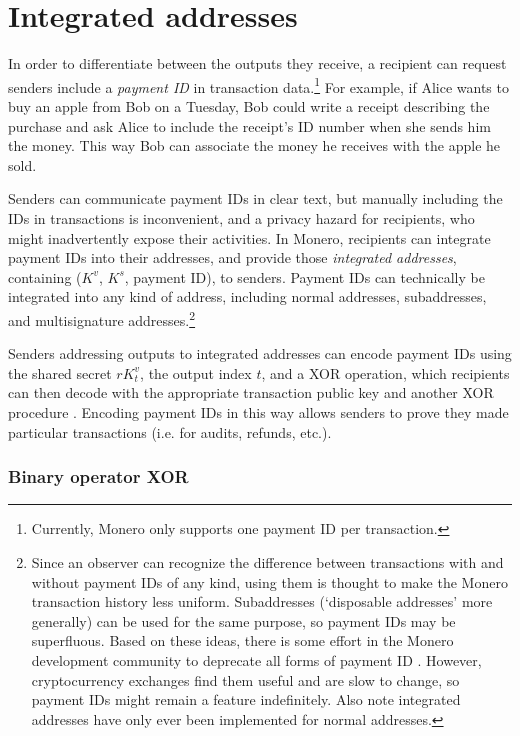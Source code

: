 \section{Integrated addresses}
\label{sec:integrated-addresses}

In order to differentiate between the outputs they receive, a recipient can request senders include a {\em payment ID} in transaction data.\footnote{Currently, Monero only supports one payment ID per transaction.} For example, if Alice wants to buy an apple from Bob on a Tuesday, Bob could write a receipt describing the purchase and ask Alice to include the receipt's ID number when she sends him the money. This way Bob can associate the money he receives with the apple he sold.

Senders can communicate payment IDs in clear text, but manually including the IDs in transactions is inconvenient, and a privacy hazard for recipients, who might inadvertently expose their activities. In Monero, recipients can integrate payment IDs into their addresses, and provide those {\em integrated addresses}, containing ($K^v$, $K^s$, payment ID), to senders. Payment IDs can technically be integrated into any kind of address, including normal addresses, subaddresses, and multisignature addresses.\footnote{Since an observer can recognize the difference between transactions with and without payment IDs of any kind, using them is thought to make the Monero transaction history less uniform. Subaddresses (`disposable addresses' more generally) can be used for the same purpose, so payment IDs may be superfluous. Based on these ideas, there is some effort in the Monero development community to deprecate all forms of payment ID \cite{deprecating-payment-ids}. However, cryptocurrency exchanges find them useful and are slow to change, so payment IDs might remain a feature indefinitely. Also note integrated addresses have only ever been implemented for normal addresses.}

Senders addressing outputs to integrated addresses can encode payment IDs using the shared secret $r K_t^v$, the output index $t$, and a XOR operation, which recipients can then decode with the appropriate transaction public key and another XOR procedure \cite{integrated-addresses}. Encoding payment IDs in this way allows senders to prove they made particular transactions (i.e. for audits, refunds, etc.).
    
\subsubsection*{Binary operator XOR}

